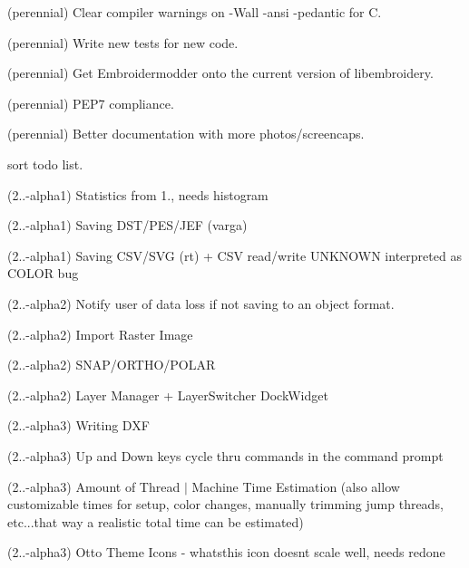 \begin{DoxyRefList}
(perennial) Clear compiler warnings on {\ttfamily -\/Wall -\/ansi -\/pedantic} for C. 



(perennial) Write new tests for new code. 



(perennial) Get Embroidermodder onto the current version of libembroidery. 



(perennial) PEP7 compliance. 



(perennial) Better documentation with more photos/screencaps.

\label{todo__todo000020}%
%
sort todo list.

\label{todo__todo000021}%
%
(2..-\/alpha1) Statistics from 1., needs histogram

\label{todo__todo000022}%
%
(2..-\/alpha1) Saving DST/\+PES/\+JEF (varga)

\label{todo__todo000023}%
%
(2..-\/alpha1) Saving CSV/\+SVG (rt) + CSV read/write UNKNOWN interpreted as COLOR bug

\label{todo__todo000024}%
%
(2..-\/alpha2) Notify user of data loss if not saving to an object format.

\label{todo__todo000025}%
%
(2..-\/alpha2) Import Raster Image

\label{todo__todo000026}%
%
(2..-\/alpha2) SNAP/\+ORTHO/\+POLAR

\label{todo__todo000027}%
%
(2..-\/alpha2) Layer Manager + Layer\+Switcher Dock\+Widget

\label{todo__todo000029}%
%
(2..-\/alpha3) Writing DXF

\label{todo__todo000030}%
%
(2..-\/alpha3) Up and Down keys cycle thru commands in the command prompt

\label{todo__todo000031}%
%
(2..-\/alpha3) Amount of Thread $|$ Machine Time Estimation (also allow customizable times for setup, color changes, manually trimming jump threads, etc...that way a realistic total time can be estimated)

\label{todo__todo000032}%
%
(2..-\/alpha3) Otto Theme Icons -\/ whatsthis icon doesn\textquotesingle{}t scale well, needs redone


\end{DoxyRefList}

